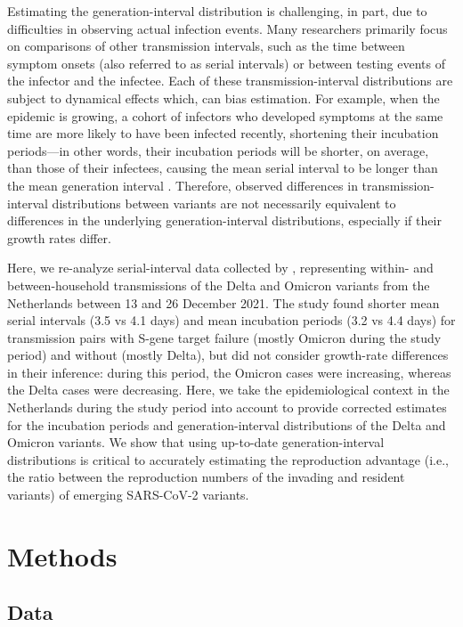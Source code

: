 \documentclass[12pt]{article}
\begin{document}
Estimating the generation-interval distribution is challenging, in part, due to difficulties in observing actual infection events.
Many researchers primarily focus on comparisons of other transmission intervals, such as the time between symptom onsets (also referred to as serial intervals) or between testing events \citep{abbott2022test} of the infector and the infectee.
Each of these transmission-interval distributions are subject to dynamical effects which, can bias estimation.
For example, when the epidemic is growing, a cohort of infectors who developed symptoms at the same time are more likely to have been infected recently, shortening their incubation periods---in other words, their incubation periods will be shorter, on average, than those of their infectees, causing the mean serial interval to be longer than the mean generation interval \citep{park2021forward}.
Therefore, observed differences in transmission-interval distributions between variants are not necessarily equivalent to differences in the underlying generation-interval distributions, especially if their growth rates differ.

Here, we re-analyze serial-interval data collected by \citep{backer2021omicron}, representing within- and between-household transmissions of the Delta and Omicron variants from the Netherlands between 13 and 26 December 2021.
The study found shorter mean serial intervals (3.5 vs 4.1 days) and mean incubation periods (3.2 vs 4.4 days) for transmission pairs with S-gene target failure (mostly Omicron during the study period) and without (mostly Delta), but did not consider growth-rate differences in their inference:
during this period, the Omicron cases were increasing, whereas the Delta cases were decreasing.
Here, we take the epidemiological context in the Netherlands during the study period into account to provide corrected estimates for the incubation periods and generation-interval distributions of the Delta and Omicron variants.
We show that using up-to-date generation-interval distributions is critical to accurately estimating the reproduction advantage (i.e., the ratio between the reproduction numbers of the invading and resident variants) of emerging SARS-CoV-2 variants.

\section{Methods}

\subsection{Data}
\end{document}
